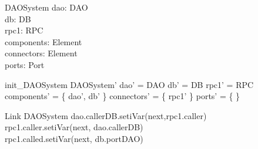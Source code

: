 \begin{schema}{DAOSystem}
dao: DAO \\ 
db: DB \\
rpc1: RPC \\
components: \pset Element \\
connectors: \pset Element \\
ports: \pset Port 
\end{schema}

\begin{zed}
init\_DAOSystem \sdef \lsch 
DAOSystem' \bbar 
dao' = \new DAO
\land db' = \new DB
\land rpc1' = \new RPC
\land components' = \{ dao', db' \}
\land connectors' = \{ rpc1' \}
\land ports' = \{ \}  
\rsch  
\end{zed}

\begin{schema}{Link}
\Delta DAOSystem 
\where 
dao.callerDB.setiVar(next,rpc1.caller) \\
rpc1.caller.setiVar(next, dao.callerDB) \\
rpc1.called.setiVar(next, db.portDAO) 
\end{schema}

